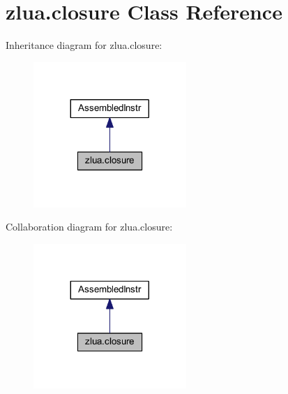 \hypertarget{classzlua_1_1closure}{}\section{zlua.\+closure Class Reference}
\label{classzlua_1_1closure}


Inheritance diagram for zlua.\+closure\+:
\nopagebreak
\begin{figure}[H]
\begin{center}
\leavevmode
\includegraphics[width=164pt]{classzlua_1_1closure__inherit__graph}
\end{center}
\end{figure}


Collaboration diagram for zlua.\+closure\+:
\nopagebreak
\begin{figure}[H]
\begin{center}
\leavevmode
\includegraphics[width=164pt]{classzlua_1_1closure__coll__graph}
\end{center}
\end{figure}

